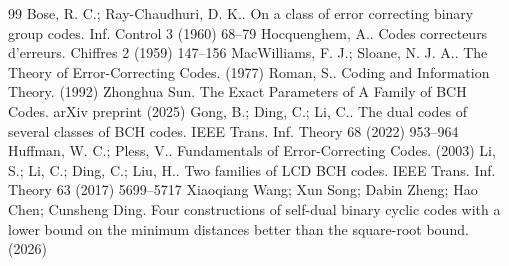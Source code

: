 \documentclass[10pt,a4paper]{amsart}
\begin{document}
\begin{thebibliography}{99}
 Bose, R. C.; Ray-Chaudhuri, D. K.. On a class of error correcting binary group codes. Inf. Control 3 (1960) 68--79
 Hocquenghem, A.. Codes correcteurs d'erreurs. Chiffres 2 (1959) 147--156
 MacWilliams, F. J.; Sloane, N. J. A.. The Theory of Error-Correcting Codes. (1977)
 Roman, S.. Coding and Information Theory. (1992)
 Zhonghua Sun. The Exact Parameters of {A} Family of {BCH} Codes. arXiv preprint (2025)
 Gong, B.; Ding, C.; Li, C.. The dual codes of several classes of {BCH} codes. IEEE Trans. Inf. Theory 68 (2022) 953--964
 Huffman, W. C.; Pless, V.. Fundamentals of Error-Correcting Codes. (2003)
 Li, S.; Li, C.; Ding, C.; Liu, H.. Two families of {LCD} {BCH} codes. IEEE Trans. Inf. Theory 63 (2017) 5699--5717
 Xiaoqiang Wang; Xun Song; Dabin Zheng; Hao Chen; Cunsheng Ding. Four constructions of self-dual binary cyclic codes with a lower bound on the minimum distances better than the square-root bound. (2026)
\end{thebibliography}
\end{document}
